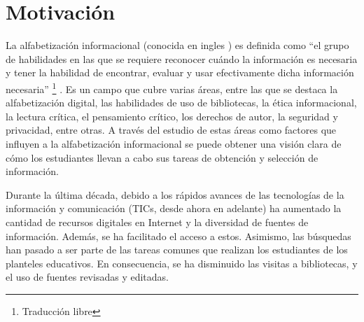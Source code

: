 \section{Motivación}
\label{sec:motivacion}

La alfabetización informacional (conocida en ingles ) es definida como “el grupo de habilidades en las que se requiere reconocer cuándo la información es necesaria y tener la habilidad de encontrar, evaluar y usar efectivamente dicha información necesaria” \footnote{Traducción libre} \parencite[p.~2]{american2000information}. Es un campo que cubre varias áreas, entre las que se destaca la alfabetización digital, las habilidades de uso de bibliotecas, la ética informacional, la lectura crítica, el pensamiento crítico, los derechos de autor, la seguridad y privacidad, entre otras. A través del estudio de estas áreas como factores que influyen a la alfabetización informacional se puede obtener una visión clara de cómo los estudiantes llevan a cabo sus tareas de obtención y selección de información.


Durante la última década, debido a los rápidos avances de las tecnologías de la información y comunicación (TICs, desde ahora en adelante) ha aumentado la cantidad de recursos digitales en Internet y la diversidad de fuentes de información. Además, se ha facilitado el acceso a estos. Asimismo, las búsquedas  han pasado a ser parte de las tareas comunes que realizan los estudiantes de los planteles educativos. En consecuencia, se ha disminuido las visitas a bibliotecas, y el uso de fuentes revisadas y editadas.

